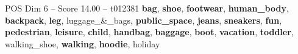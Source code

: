 \begin{textsample}{POS Dim 6 – Score 14.00 – t012381}  \label{ex:f6_pos_038}
\textbf{bag}, \textbf{shoe}, \textbf{footwear}, \textbf{human\_body}, \textbf{backpack}, \textbf{leg}, luggage\_\&\_bags, \textbf{public\_space}, \textbf{jeans}, \textbf{sneakers}, \textbf{fun}, \textbf{pedestrian}, \textbf{leisure}, \textbf{child}, \textbf{handbag}, \textbf{baggage}, \textbf{boot}, \textbf{vacation}, \textbf{toddler}, walking\_shoe, \textbf{walking}, \textbf{hoodie}, holiday

\end{textsample}
